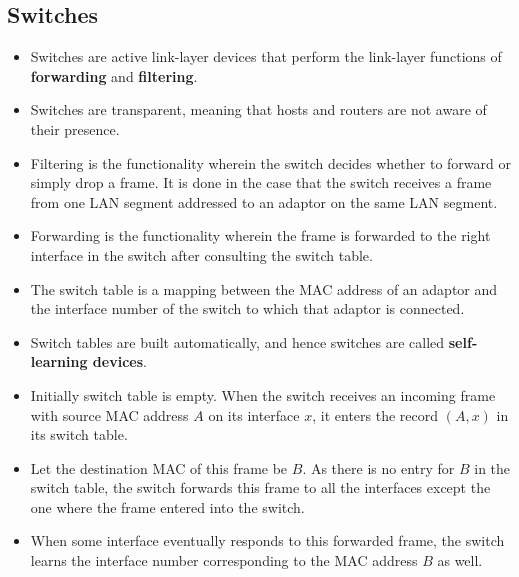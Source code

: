 \documentclass[a4paper]{article}
\theoremstyle{plain}
\theoremstyle{definition}
\begin{document}
\subsection{Switches}
\begin{itemize}
    \item Switches are active link-layer devices that perform the link-layer functions of \textbf{forwarding} and \textbf{filtering}.
    
    \item Switches are transparent, meaning that hosts and routers are not aware of their presence. 
    
    \item Filtering is the functionality wherein the switch decides whether to forward or simply drop a frame. It is done in the case that the switch receives a frame from one LAN segment addressed to an adaptor on the same LAN segment. 
    
    \item Forwarding is the functionality wherein the frame is forwarded to the right interface in the switch after consulting the switch table. 
    
    \item The switch table is a mapping between the MAC address of an adaptor and the interface number of the switch to which that adaptor is connected. 
    
    \item Switch tables are built automatically, and hence switches are called \textbf{self-learning devices}. 
    
    \item Initially switch table is empty. When the switch receives an incoming frame with source MAC address $A$ on its interface $x$, it enters the record $(A, x)$ in its switch table. 
    
    \item Let the destination MAC of this frame be $B$. As there is no entry for $B$ in the switch table, the switch forwards this frame to all the interfaces except the one where the frame entered into the switch. 
    
    \item When some interface eventually responds to this forwarded frame, the switch learns the interface number corresponding to the MAC address $B$ as well. 
\end{itemize}
\end{document}
